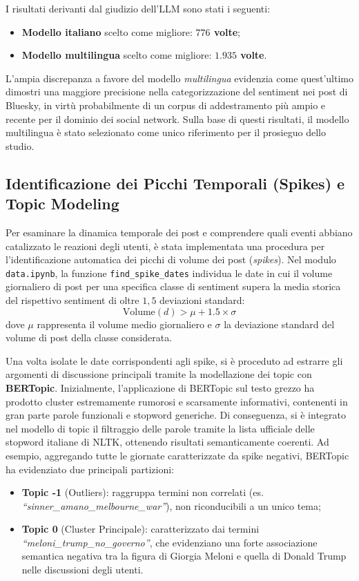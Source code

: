 \documentclass[11pt]{article}
\begin{document}
I risultati derivanti dal giudizio dell'LLM sono stati i seguenti:
\begin{itemize}
    \item \textbf{Modello italiano} scelto come migliore: \textbf{$776$ volte};
    \item \textbf{Modello multilingua} scelto come migliore: \textbf{$1.935$ volte}.
\end{itemize}

L'ampia discrepanza a favore del modello \textit{multilingua} evidenzia come quest'ultimo dimostri una maggiore precisione nella categorizzazione del sentiment nei post di Bluesky, in virtù probabilmente di un corpus di addestramento più ampio e recente per il dominio dei social network. Sulla base di questi risultati, il modello multilingua è stato selezionato come unico riferimento per il prosieguo dello studio.

\subsection{Identificazione dei Picchi Temporali (Spikes) e Topic Modeling}
\label{sec:spikes}
Per esaminare la dinamica temporale dei post e comprendere quali eventi abbiano catalizzato le reazioni degli utenti, è stata implementata una procedura per l'identificazione automatica dei picchi di volume dei post (\textit{spikes}). Nel modulo \texttt{data.ipynb}, la funzione \texttt{find\_spike\_dates} individua le date in cui il volume giornaliero di post per una specifica classe di sentiment supera la media storica del rispettivo sentiment di oltre $1,5$ deviazioni standard:
\begin{equation}
\text{Volume}(d) > \mu + 1.5 \times \sigma
\label{eq:spike_detection}
\end{equation}
dove $\mu$ rappresenta il volume medio giornaliero e $\sigma$ la deviazione standard del volume di post della classe considerata.

Una volta isolate le date corrispondenti agli spike, si è proceduto ad estrarre gli argomenti di discussione principali tramite la modellazione dei topic con \textbf{BERTopic}. Inizialmente, l'applicazione di BERTopic sul testo grezzo ha prodotto cluster estremamente rumorosi e scarsamente informativi, contenenti in gran parte parole funzionali e stopword generiche. Di conseguenza, si è integrato nel modello di topic il filtraggio delle parole tramite la lista ufficiale delle stopword italiane di NLTK, ottenendo risultati semanticamente coerenti. Ad esempio, aggregando tutte le giornate caratterizzate da spike negativi, BERTopic ha evidenziato due principali partizioni:
\begin{itemize}
    \item \textbf{Topic -1} (Outliers): raggruppa termini non correlati (es. \textit{``sinner\_amano\_melbourne\_war''}), non riconducibili a un unico tema;
    \item \textbf{Topic 0} (Cluster Principale): caratterizzato dai termini \textit{``meloni\_trump\_no\_governo''}, che evidenziano una forte associazione semantica negativa tra la figura di Giorgia Meloni e quella di Donald Trump nelle discussioni degli utenti.
\end{itemize}
\end{document}
